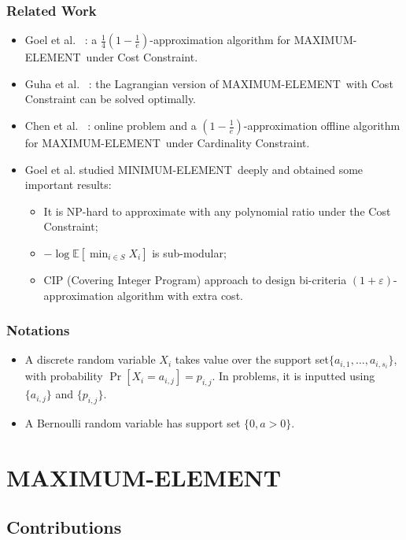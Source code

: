 \documentclass{beamer}
\newcommand{\Exp}{{\mathbb{E}}}
\newcommand{\MM}{{\textsf{MAXIMUM-ELEMENT}}}
\newcommand{\mm}{{\textsf{MINIMUM-ELEMENT}}}
\newcommand{\etal}{et al. }
\begin{document}
\begin{frame}
\frametitle{Related Work}
\begin{itemize}
    \item Goel \etal~\cite{Goel:asking}: a $\frac{1}{4}(1 - \frac{1}{e})$-approximation algorithm for \MM\ under Cost Constraint.
    \item Guha \etal~\cite{Guha07informationacquisition}: the Lagrangian version of \MM\ with Cost Constraint can be solved optimally.
    \item Chen \etal~\cite{NIPS2016:MAB}: online problem and a {\color{red}$(1-\frac{1}{e})$}-approximation offline algorithm for \MM\ under Cardinality Constraint.
    \item Goel \etal studied \mm\ deeply and obtained some important results:\cite{Goel:probe}
    \begin{itemize}
        \item It is NP-hard to approximate with any polynomial ratio under the Cost Constraint;
        \item $ -\log \Exp[\min_{i\in S} X_i]$ is sub-modular;
        \item CIP (Covering Integer Program) approach to design bi-criteria $(1+\varepsilon)$-approximation algorithm with extra cost.
    \end{itemize}
\end{itemize}
\end{frame}

\begin{frame}
    \frametitle{Notations}
    \begin{itemize}
        \item A discrete random variable $X_i$ takes value over the support set$\{a_{i,1}, \ldots, a_{i, s_i}\}$, with probability $\Pr[X_i = a_{i,j}] = p_{i,j}$. In problems, it is inputted using $\{a_{i,j}\}$ and $\{p_{i,j}\}$.
        \item A Bernoulli random variable has support set $\{0, a > 0\}$.
    \end{itemize}
\end{frame}

\section{MAXIMUM-ELEMENT}

\subsection{Contributions}
\end{document}
